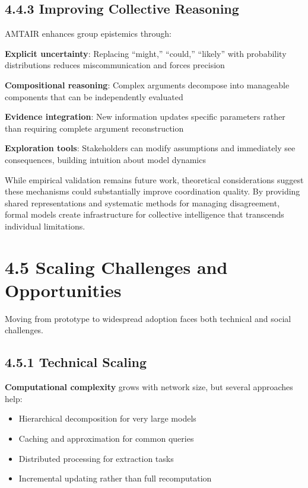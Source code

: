 \documentclass[
  11pt,
  letterpaper,
]{book}
\providecommand{\tightlist}{%
  \setlength{\itemsep}{0pt}\setlength{\parskip}{0pt}}
\begin{document}
\subsection{4.4.3 Improving Collective
Reasoning}\label{sec-collective-reasoning}

AMTAIR enhances group epistemics through:

\textbf{Explicit uncertainty}: Replacing ``might,'' ``could,''
``likely'' with probability distributions reduces miscommunication and
forces precision

\textbf{Compositional reasoning}: Complex arguments decompose into
manageable components that can be independently evaluated

\textbf{Evidence integration}: New information updates specific
parameters rather than requiring complete argument reconstruction

\textbf{Exploration tools}: Stakeholders can modify assumptions and
immediately see consequences, building intuition about model dynamics

While empirical validation remains future work, theoretical
considerations suggest these mechanisms could substantially improve
coordination quality. By providing shared representations and systematic
methods for managing disagreement, formal models create infrastructure
for collective intelligence that transcends individual limitations.

\section{4.5 Scaling Challenges and Opportunities}\label{sec-scaling}

Moving from prototype to widespread adoption faces both technical and
social challenges.

\subsection{4.5.1 Technical Scaling}\label{sec-technical-scaling}

\textbf{Computational complexity} grows with network size, but several
approaches help:

\begin{itemize}
\tightlist
\item
  Hierarchical decomposition for very large models
\item
  Caching and approximation for common queries
\item
  Distributed processing for extraction tasks
\item
  Incremental updating rather than full recomputation
\end{itemize}
\end{document}

